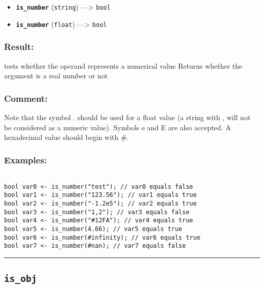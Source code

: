 \documentclass[]{book}
\providecommand{\tightlist}{%
  \setlength{\itemsep}{0pt}\setlength{\parskip}{0pt}}
\theoremstyle{definition}
\theoremstyle{definition}
\theoremstyle{definition}
\theoremstyle{remark}
\begin{document}
\begin{itemize}
\tightlist
\item
  \textbf{\texttt{is\_number}} (\texttt{string}) ---\textgreater{}
  \texttt{bool}
\item
  \textbf{\texttt{is\_number}} (\texttt{float}) ---\textgreater{}
  \texttt{bool}
\end{itemize}

\subsubsection{Result:}\label{result-286}

tests whether the operand represents a numerical value Returns whether
the argument is a real number or not

\subsubsection{Comment:}\label{comment-55}

Note that the symbol . should be used for a float value (a string with ,
will not be considered as a numeric value). Symbols e and E are also
accepted. A hexadecimal value should begin with \#.

\subsubsection{Examples:}\label{examples-216}

\begin{verbatim}
 
bool var0 <- is_number("test"); // var0 equals false 
bool var1 <- is_number("123.56"); // var1 equals true 
bool var2 <- is_number("-1.2e5"); // var2 equals true 
bool var3 <- is_number("1,2"); // var3 equals false 
bool var4 <- is_number("#12FA"); // var4 equals true 
bool var5 <- is_number(4.66); // var5 equals true 
bool var6 <- is_number(#infinity); // var6 equals true 
bool var7 <- is_number(#nan); // var7 equals false
\end{verbatim}

\begin{center}\rule{0.5\linewidth}{\linethickness}\end{center}

\subsection{\texorpdfstring{\texttt{is\_obj}}{is\_obj}}\label{is_obj}
\end{document}
